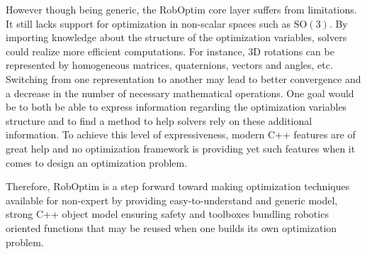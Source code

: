 \documentclass[conference,final,a4paper,twocolumn,9pt]{IEEEtran}
\begin{document}
However though being generic, the RobOptim core layer suffers from
limitations. It still lacks support for optimization in non-scalar
spaces such as $\text{SO}(3)$. By importing knowledge about the
structure of the optimization variables, solvers could realize more
efficient computations. For instance, \mbox{3D} rotations can be
represented by homogeneous matrices, quaternions, vectors and angles,
etc. Switching from one representation to another may lead to better
convergence and a decrease in the number of necessary mathematical
operations. One goal would be to both be able to express information
regarding the optimization variables structure and to find a method to
help solvers rely on these additional information. To achieve this
level of expressiveness, modern C++ features are of great help and no
optimization framework is providing yet such features when it comes to
design an optimization problem.


Therefore, RobOptim is a step forward toward making optimization
techniques available for non-expert by providing easy-to-understand
and generic model, strong C++ object model ensuring safety and
toolboxes bundling robotics oriented functions that may be reused when
one builds its own optimization problem.




\end{document}
